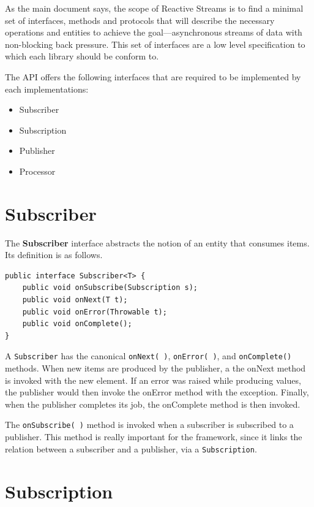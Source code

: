 As the main document says, the scope of Reactive Streams is to find a
minimal set of interfaces, methods and protocols that will describe the
necessary operations and entities to achieve the goal---asynchronous
streams of data with non-blocking back pressure. This set of interfaces
are a low level specification to which each library should be conform
to.

The API offers the following interfaces that are required to be
implemented by each implementations:

\begin{itemize}
\itemsep1pt\parskip0pt
\item
  Subscriber
\item
  Subscription
\item
  Publisher
\item
  Processor
\end{itemize}


\section{Subscriber}\label{subscriber}

The \textbf{Subscriber} interface abstracts the notion of an entity that
consumes items. Its definition is as follows.

\begin{verbatim}
public interface Subscriber<T> {
    public void onSubscribe(Subscription s);
    public void onNext(T t);
    public void onError(Throwable t);
    public void onComplete();
}
\end{verbatim}

A \texttt{Subscriber} has the canonical \texttt{onNext(\ )},
\texttt{onError(\ )}, and \texttt{onComplete()} methods. When new items
are produced by the publisher, a the onNext method is invoked with the
new element. If an error was raised while producing values, the
publisher would then invoke the onError method with the exception.
Finally, when the publisher completes its job, the onComplete method is
then invoked.

The \texttt{onSubscribe(\ )} method is invoked when a subscriber is
subscribed to a publisher. This method is really important for the
framework, since it links the relation between a subscriber and a
publisher, via a \texttt{Subscription}.

\section{Subscription}\label{subscription}

